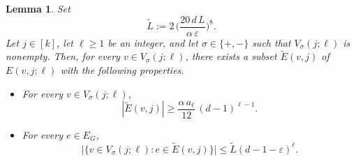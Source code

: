 \documentclass[11pt,leqno]{amsart}
\newtheorem{lemma}[theorem]{Lemma}
\theoremstyle{remark}
\theoremstyle{plain}
\begin{document}
\begin{lemma}\label{afjhsbfiasdjfhbdsifjhb}
Set
\begin{equation} \label{eq_defn_L_tilde}
\tilde{L} := 2\, \Big( \frac{20\, d\, L}{\alpha\, \varepsilon} \Big)^8.
\end{equation}
Let $j\in [k]$, let $\ell\geqslant 1$ be an integer, and let $\sigma\in \{+,-\}$ such that $V_{\sigma}(j;\ell)$ is nonempty.
Then, for every $v\in V_{\sigma}(j;\ell)$, there exists a subset $\tilde{E}(v,j)$ of $E(v,j;\ell)$
with the following properties.
\begin{itemize}
\item[(i)] For every $v\in V_{\sigma}(j;\ell)$,
\begin{equation} \label{eqkt010}
|\tilde E(v,j)|\geqslant \frac{\alpha\,a_\ell}{12}\,(d-1)^{\ell-1}.
\end{equation}
\item[(ii)] For every $e\in E_G$,
\begin{equation} \label{eqkt011}
\big|\{v\in V_{\sigma}(j;\ell)\colon e\in \tilde E(v,j)\}\big| \leqslant \tilde L(d-1-\varepsilon)^\ell.
\end{equation}
\end{itemize}
\end{lemma}
\end{document}
